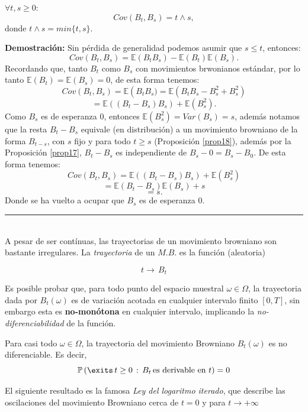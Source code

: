 \begin{cor} $\forall t,s\geq 0$:
\[Cov(B_t,B_s) = t\wedge s,\]
donde $t\wedge s = min\{t,s\}$.
\end{cor}
\textbf{Demostración:} Sin pérdida de generalidad podemos asumir que $s\leq t$, entonces:
\[Cov(B_t,B_s) = \mathbb{E}\left(B_tB_s\right) - \mathbb{E}(B_t)\mathbb{E}(B_s).\]
Recordando que, tanto $B_t$ como $B_s$ con movimientos brwonianos estándar, por lo tanto $\mathbb{E}(B_t)=\mathbb{E}(B_s)=0$, de esta forma tenemos:
\[Cov(B_t,B_s) = \mathbb{E}\left(B_tB_s) = \mathbb{E}\left(B_tB_s - B_s^2 + B_s^2\right)\]
\[ = \mathbb{E}\left((B_t - B_s)B_s\right) + \mathbb{E}(B_s^2).\]
Como $B_s$ es de esperanza 0, entonces $\mathbb{E}(B_s^2) = Var(B_s) = s$, además notamos que la resta $B_t - B_s$ equivale (en distribución) a un movimiento browniano de la forma $B_{t-s}$, con $s$ fijo y para todo $t\geq s$ (Proposición \ref{prop18}), además por la Proposición \ref{prop17}, $B_t-B_s$ es independiente de $B_s-0 = B_s-B_0$. De esta forma tenemos:
\[Cov(B_t,B_s) = \mathbb{E}\left((B_t-B_s)B_s\right) + \mathbb{E}(B_s^2)\]
\[ = \mathbb{E}\left(B_t-B_s\right)\mathbb{E}(B_s) + s\]
\[=s.\]
Donde se ha vuelto a ocupar que $B_s$ es de esperanza 0.\\\rule{0.7em}{0.7em}\\

A pesar de ser contínuas, las trayectorias de un movimiento browniano son bastante irregulares. La \textit{trayectoria} de un $M.B.$ es la función (aleatoria)

\[t\rightarrow\,B_t\]

Es posible probar que, para todo punto del espacio muestral $\omega \in \Omega$, la trayectoria dada por $B_t(\omega)$ es de variación acotada en cualquier intervalo finito $[0,T]$, sin embargo esta es \textbf{no-monótona} en cualquier intervalo, implicando la \textit{no-diferenciabilidad} de la función. \cite{Kara}

\begin{teorema} Para casi todo $\omega \in \Omega$, la trayectoria del movimiento Browniano $B_t(\omega)$ es no diferenciable. Es decir,
\[\prob\left(\exits\,t\geq 0\,:\,B_t\,\text{es derivable en }t\right) = 0\]
\end{teorema}
\newline 

El siguiente resultado es la famosa \textit{Ley del logaritmo iterado}, que describe las oscilaciones del movimiento Browniano cerca de $t=0$ y para $t\rightarrow +\infty$

